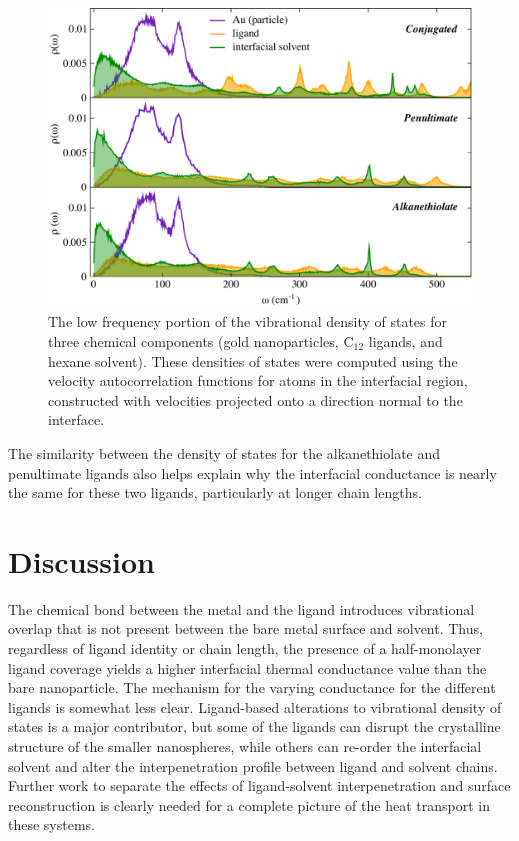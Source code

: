 \documentclass[aps,jcp,preprint,showpacs,superscriptaddress,groupedaddress]{revtex4-1}  %
\begin{document}
\begin{figure}
  \includegraphics[width=\linewidth]{figures/rho_omega_12}
  \caption{The low frequency portion of the vibrational density of
    states for three chemical components (gold nanoparticles, C$_{12}$
    ligands, and hexane solvent). These densities of states were
    computed using the velocity autocorrelation functions for atoms in
    the interfacial region, constructed with velocities projected onto
    a direction normal to the interface.}
  \label{fig:vdos}
\end{figure}

The similarity between the density of states for the alkanethiolate
and penultimate ligands also helps explain why the interfacial
conductance is nearly the same for these two ligands, particularly at
longer chain lengths.

\section{Discussion}

The chemical bond between the metal and the ligand introduces
vibrational overlap that is not present between the bare metal surface
and solvent. Thus, regardless of ligand identity or chain length, the
presence of a half-monolayer ligand coverage yields a higher
interfacial thermal conductance value than the bare nanoparticle.  The
mechanism for the varying conductance for the different ligands is
somewhat less clear.  Ligand-based alterations to vibrational density
of states is a major contributor, but some of the ligands can disrupt
the crystalline structure of the smaller nanospheres, while others can
re-order the interfacial solvent and alter the interpenetration
profile between ligand and solvent chains. Further work to separate
the effects of ligand-solvent interpenetration and surface
reconstruction is clearly needed for a complete picture of the heat
transport in these systems.
\end{document}
